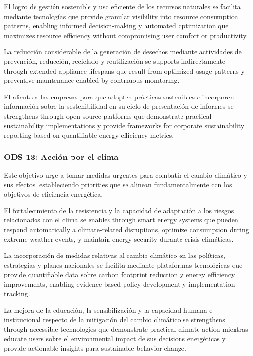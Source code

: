 El logro de gestión sostenible y uso eficiente de los recursos naturales se facilita mediante tecnologías que provide granular visibility into resource consumption patterns, enabling informed decision-making y automated optimization que maximizes resource efficiency without compromising user comfort or productivity.

La reducción considerable de la generación de desechos mediante actividades de prevención, reducción, reciclado y reutilización se supports indirectamente through extended appliance lifespans que result from optimized usage patterns y preventive maintenance enabled by continuous monitoring.

El aliento a las empresas para que adopten prácticas sostenibles e incorporen información sobre la sostenibilidad en su ciclo de presentación de informes se strengthens through open-source platforms que demonstrate practical sustainability implementations y provide frameworks for corporate sustainability reporting based on quantifiable energy efficiency metrics.

\subsubsection{ODS 13: Acción por el clima}

Este objetivo urge a tomar medidas urgentes para combatir el cambio climático y sus efectos, estableciendo priorities que se alinean fundamentalmente con los objetivos de eficiencia energética.

El fortalecimiento de la resistencia y la capacidad de adaptación a los riesgos relacionados con el clima se enables through smart energy systems que pueden respond automatically a climate-related disruptions, optimize consumption during extreme weather events, y maintain energy security durante crisis climáticas.

La incorporación de medidas relativas al cambio climático en las políticas, estrategias y planes nacionales se facilita mediante plataformas tecnológicas que provide quantifiable data sobre carbon footprint reduction y energy efficiency improvements, enabling evidence-based policy development y implementation tracking.

La mejora de la educación, la sensibilización y la capacidad humana e institucional respecto de la mitigación del cambio climático se strengthens through accessible technologies que demonstrate practical climate action mientras educate users sobre el environmental impact de sus decisions energéticas y provide actionable insights para sustainable behavior change.

